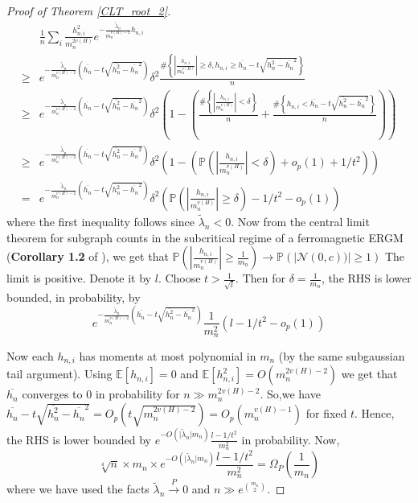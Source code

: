 \documentclass[12pt]{article}
\numberwithin{equation}{section}
\begin{document}
\begin{proof}[Proof of Theorem \ref{CLT_root_2}]
\begin{align*}
  &\frac{1}{n}\sum_i \frac{h_{n,i}^2}{m_n^{2v(H)}} e^{-\frac{\tilde{\lambda}_n}{m_n^{v(H)-2}} h_{n,i}}\\
  \ge&
     e^{-\frac{\tilde{\lambda}_n}{m_n^{v(H)-2}}\left(\overline{h_n} - t\sqrt{\overline{h_n^2} - \overline{h_n}^2}\right)} \delta^2 \frac{\# \left\{ \left|\frac{h_{n,i}}{m_n^{v(H)}}\right| \ge \delta, h_{n,i} \ge \overline{h_n} - t \sqrt{\overline{h_n^2} - \overline{h_n}^2} \right\}}{n} \\
    \ge& e^{-\frac{\tilde{\lambda}_n}{m_n^{v(H)-2}}\left(\overline{h_n} - t\sqrt{\overline{h_n^2} - \overline{h_n}^2}\right)} \delta^2 \left(1 - \left( \frac{\# \left\{ \left|\frac{h_{n,i}}{m_n^{v(H)}}\right| < \delta \right\}}{n} + \frac{\# \left\{h_{n,i} < \overline{h_n} - t \sqrt{\overline{h_n^2} - \overline{h_n}^2}\right\}}{n}\right) \right) \\
    \ge & e^{-\frac{\tilde{\lambda}_n}{m_n^{v(H)-2}}\left(\overline{h_n} - t\sqrt{\overline{h_n^2} - \overline{h_n}^2}\right)} \delta^2 \left(1 - \left( \mathbb{P}\left(\left|\frac{h_{n,i}}{m_n^{v(H)}}\right|<\delta\right) + o_p(1) + 1/t^2 \right) \right) \\
    = & e^{-\frac{\tilde{\lambda}_n}{m_n^{v(H)-2}}\left(\overline{h_n} - t\sqrt{\overline{h_n^2} - \overline{h_n}^2}\right)} \delta^2 \left( \mathbb{P}\left(\left|\frac{h_{n,i}}{m_n^{v(H)}}\right| \ge \delta\right) - 1/t^2 - o_p(1) \right)
\end{align*}
where the first inequality follows since $\tilde{\lambda}_n<0$. Now from the central limit theorem for subgraph counts in the subcritical regime of a ferromagnetic ERGM (\textbf{Corollary 1.2} of \cite{winstein2025quantitative}), we get that 
$\mathbb{P}\left(\left|\frac{h_{n,i}}{m_n^{v(H)}}\right|\geq \frac{1}{m_n}\right)\rightarrow \mathbb{P}\left(\left|\mathcal{N}(0,c))\right|\geq 1\right) $
The limit is positive. Denote it by \(l\). Choose \(t>\frac{1}{\sqrt{l}}\).
Then for \(\delta=\frac{1}{m_n}\), the RHS is lower bounded, in probability, by
$$e^{-\frac{\tilde{\lambda}_n}{m_n^{v(H)-2}}\left(\overline{h_n} - t\sqrt{\overline{h_n^2} - \overline{h_n}^2}\right)} \frac{1}{m_n^2} \left( l - 1/t^2 - o_p(1) \right)$$

Now each $h_{n,i}$ has moments at most polynomial in $m_n$ (by the same subgaussian tail argument).  Using $\mathbb{E}[h_{n,i}]=0$ and $\mathbb{E}[h_{n,i}^2] = O(m_n^{2v(H)-2})$  we get that $\overline{h_n}$ converges to $0$ in probability for $n\gg m_n^{2v(H)-2}$. So,we have \(\overline{h_n}-t\sqrt{\overline{h_n^2}-\overline{h_n}^2} = O_p\left(t\sqrt{m_n^{2v(H)-2}}\right) = O_p(m_n^{v(H)-1})\) for fixed \(t\). Hence, the RHS is lower bounded by $e^{-O(\lvert\tilde{\lambda}_n\rvert m_n)}\frac{l-1/t^2}{m_n^2}$ in probability. Now,
\[\sqrt[4]{n}\times m_n\times  e^{-O(\lvert\tilde{\lambda}_n\rvert m_n)}\frac{l-1/t^2}{m_n^2} = \Omega_P\left(\frac{1}{m_n}\right)\]
where we have used the facts \(\tilde{\lambda}_n\xrightarrow{P}0\) and \(n\gg e^{{m_n\choose 2}}\).


\end{proof}
\end{document}
